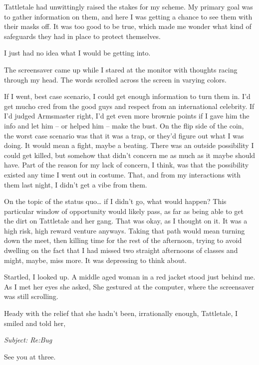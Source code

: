 Tattletale had unwittingly raised the stakes for my scheme. My primary goal was to gather information on them, and here I was getting a chance to see them with their masks off. It was too good to be true, which made me wonder what kind of safeguards they had in place to protect themselves.

I just had no idea what I would be getting into.

The screensaver came up while I stared at the monitor with thoughts racing through my head. The words  scrolled across the screen in varying colors.

If I went, best case scenario, I could get enough information to turn them in. I'd get mucho cred from the good guys and respect from an international celebrity. If I'd judged Armsmaster right, I'd get even more brownie points if I gave him the info and let him -- or helped him -- make the bust. On the flip side of the coin, the worst case scenario was that it was a trap, or they'd figure out what I was doing. It would mean a fight, maybe a beating. There was an outside possibility I could get killed, but somehow that didn't concern me as much as it maybe should have. Part of the reason for my lack of concern, I think, was that the possibility existed any time I went out in costume. That, and from my interactions with them last night, I didn't get a  vibe from them.

On the topic of the status quo\ldots{} if I didn't go, what would happen? This particular window of opportunity would likely pass, as far as being able to get the dirt on Tattletale and her gang. That was okay, as I thought on it. It was a high risk, high reward venture anyways. Taking that path would mean turning down the meet, then killing time for the rest of the afternoon, trying to avoid dwelling on the fact that I had missed two straight afternoons of classes and might, maybe, miss more. It was depressing to think about.


Startled, I looked up. A middle aged woman in a red jacket stood just behind me. As I met her eyes she asked,  She gestured at the computer, where the screensaver was still scrolling.

Heady with the relief that she hadn't been, irrationally enough, Tattletale, I smiled and told her, 

{\it Subject: Re:Bug

See you at three.}


